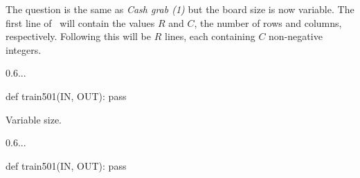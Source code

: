 
\clearpage


The question is the same as \emph{Cash grab (1)} but the board size is now variable. The
first line of \IN\ will contain the values $R$ and $C$, the number of rows and columns,
respectively. Following this will be $R$ lines, each containing $C$ non-negative integers.

\Sample

       {0.6}{...}

\Solution

\begin{pythoncode}
  def train501(IN, OUT):
    pass
\end{pythoncode}



\clearpage


Variable size.

\Sample

       {0.6}{...}

\Solution

\begin{pythoncode}
  def train501(IN, OUT):
    pass
\end{pythoncode}

